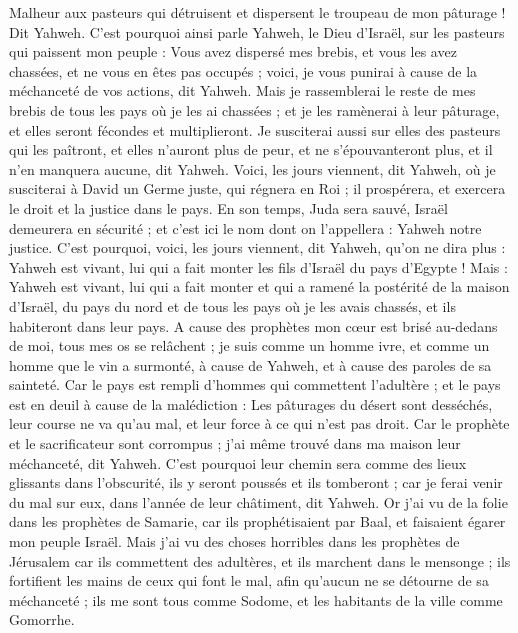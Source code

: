 \begin{multicols}{2}
\VerseOne{}Malheur aux pasteurs qui détruisent et dispersent le troupeau de mon pâturage ! Dit Yahweh.
C'est pourquoi ainsi parle Yahweh, le Dieu d'Israël, sur les pasteurs qui paissent mon peuple : Vous avez dispersé mes brebis, et vous les avez chassées, et ne vous en êtes pas occupés ; voici, je vous punirai à cause de la méchanceté de vos actions, dit Yahweh.
Mais je rassemblerai le reste de mes brebis de tous les pays où je les ai chassées ; et je les ramènerai à leur pâturage, et elles seront fécondes et multiplieront.
Je susciterai aussi sur elles des pasteurs qui les paîtront, et elles n'auront plus de peur, et ne s'épouvanteront plus, et il n'en manquera aucune, dit Yahweh.
Voici, les jours viennent, dit Yahweh, où je susciterai à David un Germe juste, qui régnera en Roi ; il prospérera, et exercera le droit et la justice dans le pays.
En son temps, Juda sera sauvé, Israël demeurera en sécurité ; et c'est ici le nom dont on l'appellera : Yahweh notre justice.
C'est pourquoi, voici, les jours viennent, dit Yahweh, qu'on ne dira plus : Yahweh est vivant, lui qui a fait monter les fils d'Israël du pays d'Egypte !
Mais : Yahweh est vivant, lui qui a fait monter et qui a ramené la postérité de la maison d'Israël, du pays du nord et de tous les pays où je les avais chassés, et ils habiteront dans leur pays.
A cause des prophètes mon cœur est brisé au-dedans de moi, tous mes os se relâchent ; je suis comme un homme ivre, et comme un homme que le vin a surmonté, à cause de Yahweh, et à cause des paroles de sa sainteté.
Car le pays est rempli d'hommes qui commettent l'adultère ; et le pays est en deuil à cause de la malédiction : Les pâturages du désert sont desséchés, leur course ne va qu'au mal, et leur force à ce qui n'est pas droit.
Car le prophète et le sacrificateur sont corrompus ; j'ai même trouvé dans ma maison leur méchanceté, dit Yahweh.
C'est pourquoi leur chemin sera comme des lieux glissants dans l'obscurité, ils y seront poussés et ils tomberont ; car je ferai venir du mal sur eux, dans l'année de leur châtiment, dit Yahweh.
Or j'ai vu de la folie dans les prophètes de Samarie, car ils prophétisaient par Baal, et faisaient égarer mon peuple Israël.
Mais j'ai vu des choses horribles dans les prophètes de Jérusalem car ils commettent des adultères, et ils marchent dans le mensonge ; ils fortifient les mains de ceux qui font le mal, afin qu'aucun ne se détourne de sa méchanceté ; ils me sont tous comme Sodome, et les habitants de la ville comme Gomorrhe.

\end{multicols}

